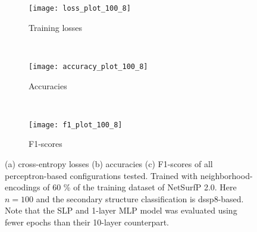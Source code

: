         \begin{figure}[H]
            \centering
            \begin{minipage}[b]{.6\textwidth}
                \begin{subfigure}[b]{\textwidth}
                \texttt{[image: loss\_plot\_100\_8]}
                \caption{Training losses}
                \label{fig:loss}
            \end{subfigure}
            \end{minipage}
            \\
            \centering
            \begin{minipage}[b]{.6\textwidth}
            \begin{subfigure}[b]{\textwidth}
                \texttt{[image: accuracy\_plot\_100\_8]}
                \caption{Accuracies}
                \label{fig:accuracy}
            \end{subfigure}
            \end{minipage}
            \\
            \centering
            \begin{minipage}[b]{.6\textwidth}
            \begin{subfigure}[b]{\textwidth}
                \texttt{[image: f1\_plot\_100\_8]}
                \caption{F1-scores}\label{fig:f1}
            \end{subfigure}
            \end{minipage}
            \caption{(a) cross-entropy losses (b) accuracies (c) F1-scores of all perceptron-based configurations tested. Trained with neighborhood-encodings of 60 \% of the training dataset of NetSurfP 2.0. Here $n=100$ and the secondary structure classification is dssp8-based. Note that the SLP and 1-layer MLP model was evaluated using fewer epochs than their 10-layer counterpart.}\label{fig:she4}
            \end{figure}